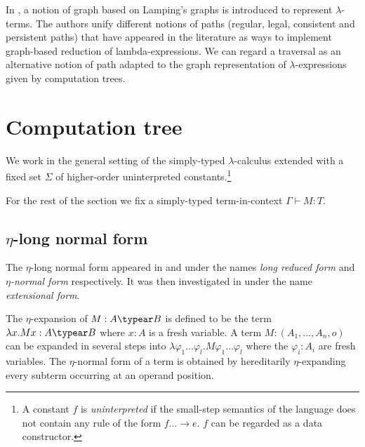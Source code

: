 In \cite{DBLP:conf/lics/AspertiDLR94}, a notion of graph based on Lamping's graphs \citep{lamping} is introduced to represent $\lambda$-terms. The authors unify different notions of paths (regular, legal, consistent and persistent paths) that have appeared in the literature as ways to implement graph-based reduction of lambda-expressions. We can regard a traversal as an alternative notion of path adapted to the graph representation of $\lambda$-expressions given by computation trees.

%

\section{Computation tree}
We work in the general setting of the simply-typed
$\lambda$-calculus extended with a fixed set $\Sigma$ of
higher-order uninterpreted constants.\footnote{A constant $f$ is
  \emph{uninterpreted} if the small-step semantics of the language
  does not contain any rule of the form $f \dots \rightarrow e$. $f$
  can be regarded as a data constructor.}

For the rest of the section we fix a simply-typed term-in-context
$\Gamma \vdash M :T$.

\subsection{$\eta$-long normal form}

The $\eta$-long normal form appeared in
\citep{DBLP:journals/tcs/JensenP76} and
\citep{DBLP:journals/tcs/Huet75} under the names \emph{long reduced
form} and \emph{$\eta$-normal form} respectively. It was then
investigated in \citep{huet76} under the name \emph{extensional
form}.

The $\eta$-expansion of $M: A\typear B$ is defined to be the term
$\lambda x . M x : A\typear B$ where $x:A$ is a fresh variable. A
term $M : (A_1,\ldots,A_n,o)$ can be expanded in several steps into
$\lambda \varphi_1 \ldots \varphi_l . M \varphi_1 \ldots \varphi_l$
where the $\varphi_i:A_i$ are fresh variables. The $\eta$-normal
form of a term is obtained by hereditarily $\eta$-expanding every
subterm occurring at an operand position.

